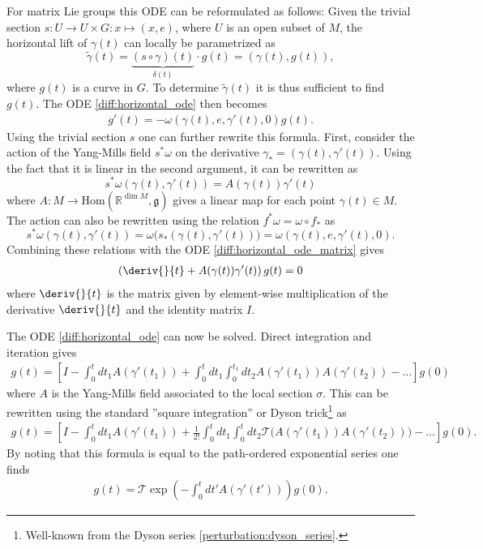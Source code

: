     \begin{example}
         For matrix Lie groups this ODE can be reformulated as follows: Given the trivial section $s:U\rightarrow U\times G:x\mapsto (x, e)$, where $U$ is an open subset of $M$, the horizontal lift of $\gamma(t)$ can locally be parametrized as \[\widetilde{\gamma}(t) = \underbrace{(s\circ\gamma)(t)}_{\delta(t)}\cdot g(t) = (\gamma(t), g(t)),\] where $g(t)$ is a curve in $G$. To determine $\widetilde{\gamma}(t)$ it is thus sufficient to find $g(t)$. The ODE \eqref{diff:horizontal_ode} then becomes
        \begin{gather}
            \label{diff:horizontal_ode_matrix}
            g'(t) = -\omega(\gamma(t), e, \gamma'(t), 0)g(t).
        \end{gather}
        Using the trivial section $s$ one can further rewrite this formula. First, consider the action of the Yang-Mills field $s^*\omega$ on the derivative $\gamma_* = (\gamma(t), \gamma'(t))$. Using the fact that it is linear in the second argument, it can be rewritten as \[s^*\omega(\gamma(t), \gamma'(t)) = A(\gamma(t))\gamma'(t)\] where $A:M\rightarrow\text{Hom}(\mathbb{R}^{\dim M}, \mathfrak{g})$ gives a linear map for each point $\gamma(t)\in M$. The action can also be rewritten using the relation $f^*\omega = \omega\circ f_\ast$ as\[s^*\omega(\gamma(t), \gamma'(t)) = \omega\Big(s_\ast(\gamma(t), \gamma'(t))\Big) = \omega(\gamma(t), e, \gamma'(t), 0).\] Combining these relations with the ODE \eqref{diff:horizontal_ode_matrix} gives
        \begin{gather}
            \label{diff:horizontal_ode_derivative}
            \left(\deriv{}{t} + A(\gamma(t))\gamma'(t)\right)g(t) = 0
        \end{gather}
        where $\deriv{}{t}$ is the matrix given by element-wise multiplication of the derivative $\deriv{}{t}$ and the identity matrix $I$.

        The ODE \eqref{diff:horizontal_ode} can now be solved. Direct integration and iteration gives
        \begin{gather}
            g(t) = \left[I - \int_0^tdt_1A(\gamma'(t_1)) + \int_0^tdt_1\int_0^{t_1}dt_2A(\gamma'(t_1))A(\gamma'(t_2))-\ldots\right]g(0)
        \end{gather}
        where $A$ is the Yang-Mills field associated to the local section $\sigma$. This can be rewritten using the standard ''square integration'' or Dyson trick\footnote{Well-known from the Dyson series \ref{perturbation:dyson_series}.} as
        \begin{gather}
            g(t) = \left[I - \int_0^tdt_1A(\gamma'(t_1)) + \frac{1}{2!}\int_0^tdt_1\int_0^tdt_2\mathcal{T}\Big(A(\gamma'(t_1))A(\gamma'(t_2))\Big)-\ldots\right]g(0).
        \end{gather}
        By noting that this formula is equal to the path-ordered exponential series one finds
        \begin{gather}
            \label{diff:g0_to_gt}
            g(t) = \mathcal{T}\exp\left(-\int_0^tdt'A(\gamma'(t'))\right)g(0).
        \end{gather}
    \end{example}

